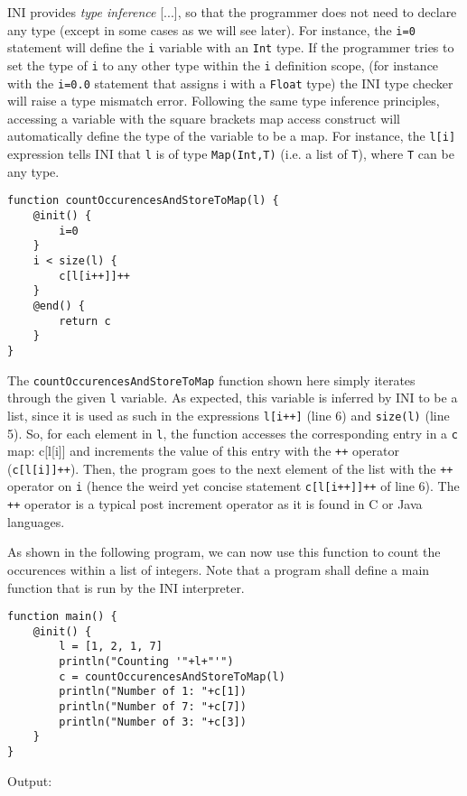 \documentclass[11pt]{article}
\begin{document}
INI provides \emph{type inference} [...], so that the programmer does not need to declare any type (except in some cases as we will see later). For instance, the \texttt{i=0} statement will define the \texttt{i} variable with an \texttt{Int} type. If the programmer tries to set the type of \texttt{i} to any other type within the \texttt{i} definition scope, (for instance with the \texttt{i=0.0} statement that assigns i with a \texttt{Float} type) the INI type checker will raise a type mismatch error. Following the same type inference principles, accessing a variable with the square brackets map access construct will automatically define the type of the variable to be a map. For instance, the \texttt{l[i]} expression tells INI that \texttt{l} is of type \texttt{Map(Int,T)} (i.e. a list of \texttt{T}), where \texttt{T} can be any type.

\begin{lstlisting}
function countOccurencesAndStoreToMap(l) {
	@init() {
		i=0
	}
	i < size(l) {
		c[l[i++]]++
	}
	@end() {
		return c
	}
}
\end{lstlisting}

The \texttt{countOccurencesAndStoreToMap} function shown here simply iterates through the given \texttt{l} variable. As expected, this variable is inferred by INI to be a list, since it is used as such in the expressions \texttt{l[i++]} (line 6) and \texttt{size(l)} (line 5). So, for each element in \texttt{l}, the function accesses the corresponding entry in a \texttt{c} map: c[l[i]] and increments the value of this entry with the \texttt{++} operator (\texttt{c[l[i]]++}). Then, the program goes to the next element of the list with the \texttt{++} operator on \texttt{i} (hence the weird yet concise statement \texttt{c[l[i++]]++} of line 6). The \texttt{++} operator is a typical post increment operator as it is found in C or Java languages.

As shown in the following program, we can now use this function to count the occurences within a list of integers. Note that a program shall define a main function that is run by the INI interpreter.

\begin{lstlisting}
function main() {
	@init() {
		l = [1, 2, 1, 7]
		println("Counting '"+l+"'")
		c = countOccurencesAndStoreToMap(l)
		println("Number of 1: "+c[1])
		println("Number of 7: "+c[7])
		println("Number of 3: "+c[3])
	}
}
\end{lstlisting}

Output:
\end{document}
